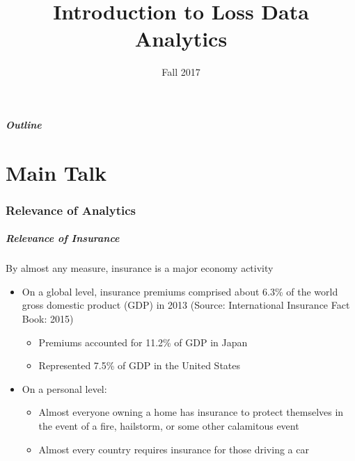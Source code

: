 \documentclass[serif,10pt]{beamer}
\title[Introduction]{Introduction to Loss Data Analytics}
\date[Fall 2017]{Fall 2017}
\begin{document}
\frame{\titlepage}

\begin{frame}
  \frametitle{Outline}
     \tableofcontents[part=1]
\end{frame}

\part<presentation>{Main Talk}


\section[Relevance]{Relevance of Analytics}

\begin{frame}
\frametitle{Relevance of Insurance} By almost any measure, insurance
is a major economy activity \vspace{2mm}

  \begin{itemize}
\item On a global level, insurance premiums comprised about 6.3\% of the world gross domestic product (GDP) in 2013 (Source: International Insurance Fact Book:
2015) \vspace{2mm}
  \begin{itemize}
\item  Premiums accounted for 11.2\% of GDP in Japan \vspace{2mm}
\item  Represented 7.5\% of GDP in the United States \vspace{2mm}
\end{itemize} \vspace{4mm}

\item On a personal level: \vspace{2mm}

  \begin{itemize}
\item Almost everyone owning a home has insurance to protect themselves in the event of a fire, hailstorm, or some other calamitous
event \vspace{2mm}
\item Almost every country requires insurance for those driving a
car \vspace{2mm}
\end{itemize}\end{itemize}
\end{frame}
\end{document}
